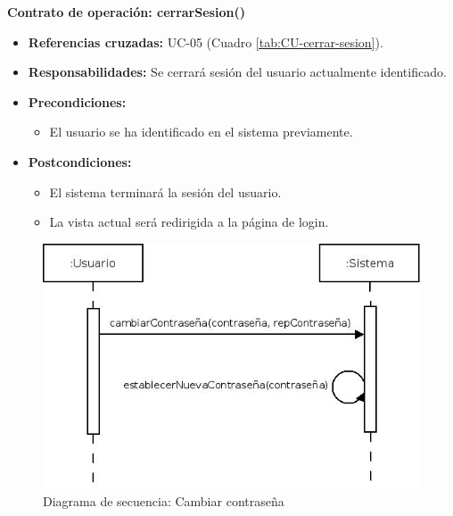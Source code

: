 \textbf{Contrato de operación: cerrarSesion()}
\begin{itemize}
\item \textbf{Referencias cruzadas:} UC-05 (Cuadro \ref{tab:CU-cerrar-sesion}).
\item \textbf{Responsabilidades:} Se cerrará sesión del usuario actualmente identificado.
\item \textbf{Precondiciones:} 
 \begin{itemize}
\item El usuario se ha identificado en el sistema previamente.
\end {itemize}
\item \textbf{Postcondiciones:} 
 \begin{itemize}
\item El sistema terminará la sesión del usuario.
\item La vista actual será redirigida a la página de login.
\end {itemize}
\end {itemize}


\vspace{10mm}

\begin{figure}[H]
\centering
  \includegraphics[scale=.55]{img/secuencias/gestion-usuarios-cambiar-contrasena.jpeg}
  \caption{Diagrama de secuencia: Cambiar contraseña}
  \label{fig:secuencia-gestion-usuarios-cambiar-contrasena}
\end{figure}

